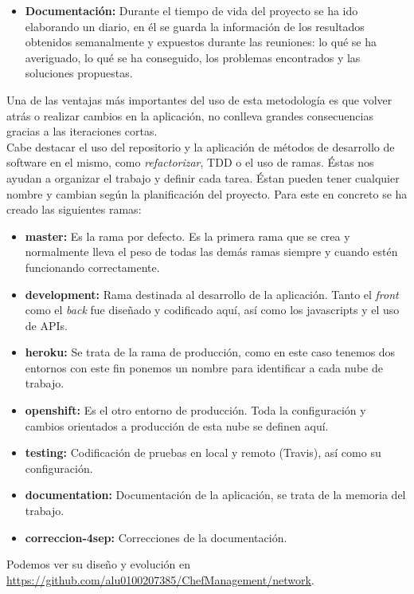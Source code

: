 \begin{itemize}
	\item \textbf{Documentación:} Durante el tiempo de vida del proyecto se ha ido elaborando un diario, en él se guarda la información de los resultados obtenidos semanalmente y expuestos durante las reuniones: lo qué se ha averiguado, lo qué se ha conseguido, los problemas encontrados y las soluciones propuestas.
\end{itemize}

Una de las ventajas más importantes del uso de esta metodología es que volver atrás o realizar cambios en la aplicación, no conlleva grandes consecuencias gracias a las iteraciones cortas. \\

Cabe destacar el uso del repositorio y la aplicación de métodos de desarrollo de software en el mismo, como \emph{refactorizar}, TDD o el uso de ramas. Éstas nos ayudan a organizar el trabajo y definir cada tarea. Éstan pueden tener cualquier nombre y cambian según la planificación del proyecto. Para este en concreto se ha creado las siguientes ramas:
\begin{itemize}
	\item \textbf{master:} Es la rama por defecto. Es la primera rama que se crea y normalmente lleva el peso de todas las demás ramas siempre y cuando estén funcionando correctamente.
	\item \textbf{development:} Rama destinada al desarrollo de la aplicación. Tanto el \emph{front} como el \emph{back} fue diseñado y codificado aquí, así como los javascripts y el uso de APIs.
	\item \textbf{heroku:} Se trata de la rama de producción, como en este caso tenemos dos entornos con este fin ponemos un nombre para identificar a cada nube de trabajo.
	\item \textbf{openshift:} Es el otro entorno de producción. Toda la configuración y cambios orientados a producción de esta nube se definen aquí.
	\item \textbf{testing:} Codificación de pruebas en local y remoto (Travis), así como su configuración.
	\item \textbf{documentation:} Documentación de la aplicación, se trata de la memoria del trabajo.
	\item \textbf{correccion-4sep:} Correcciones de la documentación.
\end{itemize}

Podemos ver su diseño y evolución en \href{https://github.com/alu0100207385/ChefManagement/network}{https://github.com/alu0100207385/ChefManagement/network}.


